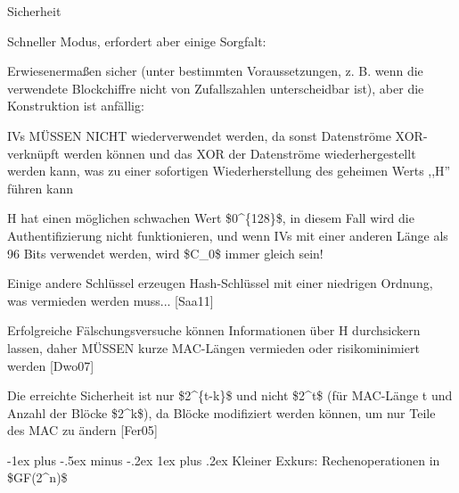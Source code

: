 \documentclass[a4paper]{article}
\makeatletter
\renewcommand{\subsubsection}{\@startsection{subsubsection}{3}{0mm}%
 {-1ex plus -.5ex minus -.2ex}%
 {1ex plus .2ex}%
 {\normalfont\small\bfseries}}
\makeatother
\begin{document}
\begin{multicols}{3}
\begin{itemize*}
            \item Sicherheit
            \begin{itemize*}
                  \item Schneller Modus, erfordert aber einige Sorgfalt:
                  \begin{itemize*} \item Erwiesenermaßen sicher (unter bestimmten Voraussetzungen, z. B. wenn die verwendete Blockchiffre nicht von Zufallszahlen unterscheidbar ist), aber die Konstruktion ist anfällig: \end{itemize*}
                  \item IVs MÜSSEN NICHT wiederverwendet werden, da sonst Datenströme XOR-verknüpft werden können und das XOR der Datenströme wiederhergestellt werden kann, was zu einer sofortigen Wiederherstellung des geheimen Werts ,,H'' führen kann
                  \item H hat einen möglichen schwachen Wert \$0\^{}\{128\}\$, in diesem Fall wird die Authentifizierung nicht funktionieren, und wenn IVs mit einer anderen Länge als 96 Bits verwendet werden, wird \$C\_0\$ immer gleich sein!
                  \item Einige andere Schlüssel erzeugen Hash-Schlüssel mit einer niedrigen Ordnung, was vermieden werden muss... {[}Saa11{]}
                  \item Erfolgreiche Fälschungsversuche können Informationen über H durchsickern lassen, daher MÜSSEN kurze MAC-Längen vermieden oder risikominimiert werden {[}Dwo07{]}
                  \item Die erreichte Sicherheit ist nur \$2\^{}\{t-k\}\$ und nicht \$2\^{}t\$ (für MAC-Länge t und Anzahl der Blöcke \$2\^{}k\$), da Blöcke modifiziert werden können, um nur Teile des MAC zu ändern {[}Fer05{]}
            \end{itemize*}
      \end{itemize*}


      \subsubsection{Kleiner Exkurs: Rechenoperationen in
      \$GF(2\^{}n)\$}


\end{multicols}
\end{document}
